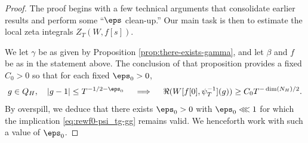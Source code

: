 \begin{proof}
  The proof begins with a few technical arguments that consolidate earlier results and perform some ``$\eps$ clean-up.''  Our main task is then to estimate the local zeta integrals $Z_T(W,f[s])$.

  We let $\gamma$ be as given by Proposition \ref{prop:there-exists-gamma}, and let $\beta$ and $f$ be as in the statement above.  The conclusion of that proposition provides a fixed $C_0 > 0$ so that for each fixed $\eps_0 > 0$,
  \begin{equation}\label{eq:rewf0-psi_tg-gg}
    g \in Q_H, \quad |g - 1| \leq T^{-1/2-\eps_0}
    \quad
    \implies
    \quad
    \Re(W[f[0], \psi_T^{-1}](g)) \geq C_0 T^{-\dim(N_H)/2}.
  \end{equation}
  By overspill, we deduce that there exists $\eps_0 > 0$ with $\eps_0 \lll 1$ for which the implication \eqref{eq:rewf0-psi_tg-gg} remains valid.  We henceforth work with such a value of $\eps_0$.


\end{proof}
